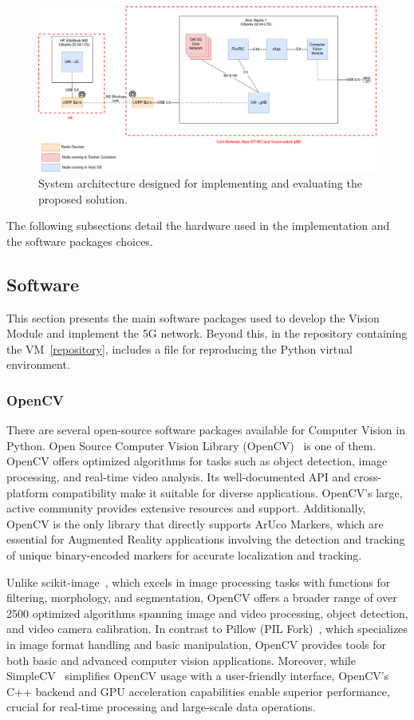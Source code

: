 \begin{figure}[H]
    \centering
    \includegraphics[width=0.75\linewidth]{figures/System Arch.drawio(3)}
    \caption[System architecture designed for implementing and evaluating the proposed solution]{System architecture designed for implementing and evaluating the proposed solution.}
    \label{fig:design_arch}
\end{figure}

The following subsections detail the hardware used in the implementation and the software packages choices.


\subsection{Software}\label{subsec:software}
This section presents the main software packages used to develop the Vision Module and implement the 5G network.
Beyond this, in the repository containing the VM~\ref{repository}, includes a file for reproducing the Python virtual environment.

\subsubsection{OpenCV}
There are several open-source software packages available for Computer Vision in Python.
Open Source Computer Vision Library (OpenCV)~\cite{opencv} is one of them.
OpenCV offers optimized algorithms for tasks such as object detection, image processing, and real-time video analysis.
Its well-documented API and cross-platform compatibility make it suitable for diverse applications.
OpenCV's large, active community provides extensive resources and support.
Additionally, OpenCV is the only library that directly supports ArUco Markers, which are essential for Augmented Reality applications involving the detection and tracking of unique binary-encoded markers for accurate localization and tracking.

Unlike scikit-image~\cite{Scikit-learn}, which excels in image processing tasks with functions for filtering, morphology, and segmentation, OpenCV offers a broader range of over 2500 optimized algorithms spanning image and video processing, object detection, and video camera calibration.
In contrast to Pillow (PIL Fork)~\cite{pillow}, which specializes in image format handling and basic manipulation, OpenCV provides tools for both basic and advanced computer vision applications.
Moreover, while SimpleCV~\cite{simplecv} simplifies OpenCV usage with a user-friendly interface, OpenCV's C++ backend and GPU acceleration capabilities enable superior performance, crucial for real-time processing and large-scale data operations.

